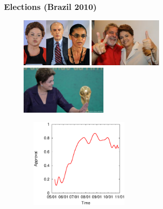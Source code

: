 \documentclass[14pt]{beamer}
\begin{document}
\begin{frame}\frametitle{Elections (Brazil 2010)}

\vspace{-0.1in}
\begin{figure}
\centering
\includegraphics[height=0.95in]{dilma1}
\includegraphics[height=0.95in]{lula}
\includegraphics[height=0.95in]{copa}
\end{figure}

\vspace{-0.15in}
\begin{figure}
\centering
\includegraphics[width=2.35in,height=1.75in]{dilmaPositividade.eps}
\end{figure}

\end{frame}
\end{document}
